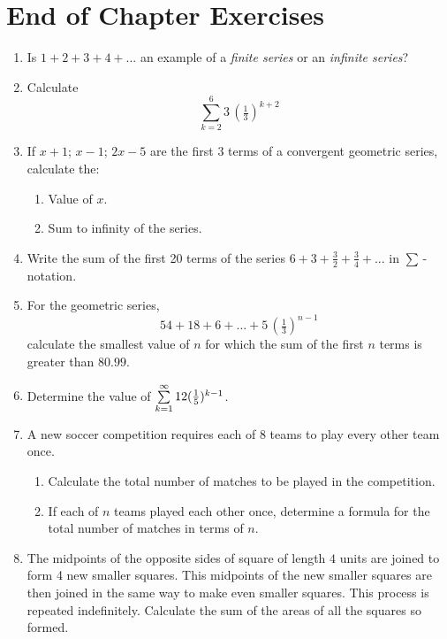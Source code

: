 \section{End of Chapter Exercises}
\begin{enumerate}

\item Is $1 + 2 + 3 + 4 + ...$ an example of a \textit{finite series} or an \textit{infinite series}?

\item Calculate $$\sum_{k=2}^6 3 \, {(\tfrac{1}{3})}^{k+2}$$

\item If $x+1$; $x-1$; $2x-5$ are the first 3 terms of a convergent geometric series, calculate the:
\begin{enumerate}
\item Value of $x$.
\item Sum to infinity of the series.
\end{enumerate}

\item Write the sum of the first 20 terms of the series $6 + 3 + \tfrac{3}{2} + \tfrac{3}{4} + ...$ in $\sum$\,-notation.

\item For the geometric series, $$54 + 18 + 6 + ... + 5 \, (\tfrac{1}{3})^{n-1}$$ calculate the smallest value of $n$ for which the sum of the first $n$ terms is greater than $80.99$.

\item Determine the value of $\sum_{k=1}^\infty \limits 12(\tfrac{1}{5})^{k-1} $.

\item A new soccer competition requires each of $8$ teams to play every other team once.
\begin{enumerate}
\item Calculate the total number of matches to be played in the competition.
\item If each of $n$ teams played each other once, determine a formula for the total number of matches in terms of $n$.
\end{enumerate}

\item The midpoints of the opposite sides of square of length $4$ units are joined to form 4 new smaller squares. This midpoints of the new smaller squares are then joined in the same way to make even smaller squares. This process is repeated indefinitely. Calculate the sum of the areas of all the squares so formed.


\end{enumerate}
